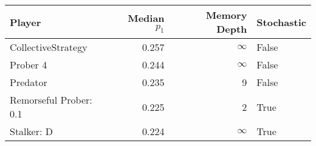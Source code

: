 \begin{tabular}{lrrl}
\toprule
                 Player &  Median $p_1$ &  Memory Depth & Stochastic \\
\midrule
     CollectiveStrategy &         0.257 &            \(\infty\) &      False \\
               Prober 4 &         0.244 &            \(\infty\) &      False \\
               Predator &         0.235 &             9 &      False \\
 Remorseful Prober: 0.1 &         0.225 &             2 &       True \\
             Stalker: D &         0.224 &            \(\infty\) &       True \\
\bottomrule
\end{tabular}
